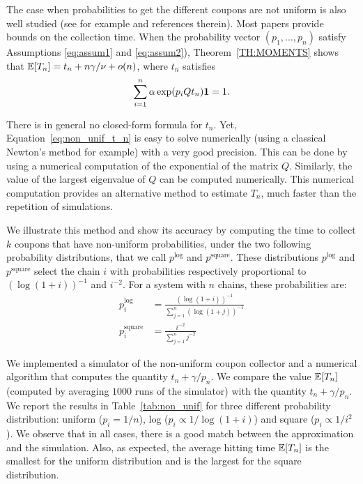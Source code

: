 \documentclass{aptpub}
\newcommand\expect[1]{\mathchoice{\bexpect{#1}}{\sexpect{#1}}{\sexpect{#1}}{\sexpect{#1}}}
\newcommand\bexpect[1]{\mathbb{E}\left[#1\right]}
\newcommand\sexpect[1]{\mathbb{E}[#1]}
\begin{document}
The case when probabilities to get the different coupons are not
uniform is also well studied (see for example \cite{Berenbrink} and
references therein).  Most papers provide bounds on the collection
time.  When the probability vector $(p_1, \dots , p_n)$ satisfy
Assumptions \eqref{eq:assum1} and \eqref{eq:assum2}),
Theorem~\ref{TH:MOMENTS} shows that
$\expect{T_n}= t_n + n\gamma/\nu + o(n)$, where $t_n$ satisfies
\begin{equation}
  \label{eq:non_unif_t_n}
  \sum_{i=1}^n \alpha \exp(p_iQt_n){\bf 1} = 1.
\end{equation}

There is in general no closed-form formula for $t_n$. Yet,
Equation~\eqref{eq:non_unif_t_n} is easy to solve numerically (using a
classical Newton's method for example) with a very good
precision. This can be done by using a numerical computation of the
exponential of the matrix $Q$.  Similarly, the value of the largest
eigenvalue of $Q$ can be computed numerically.  This numerical
computation provides an alternative method to estimate $T_n$, much
faster than the repetition of simulations.

We illustrate this method and show its accuracy by computing the time
to collect $k$ coupons that have non-uniform probabilities, under the
two following probability distributions, that we call $p^{\log}$ and
$p^{\text{square}}$. These distributions $p^{\log}$ and $p^{\text{square}}$ select the chain
$i$ with probabilities respectively proportional to
$(\log (1+i))^{-1}$ and $i^{-2}$. For a system with $n$ chains, these
probabilities are:
\begin{align*}
  p_i^{\log} &= \frac{(\log (1+i))^{-1}}{\sum_{j=1}^n (\log(1+j))^{-1}}\\
  p_i^{\text{square}} &= \frac{i^{-2}}{\sum_{j=1}^n j^{-2}}
\end{align*}

We implemented a simulator of the non-uniform coupon collector and a
numerical algorithm that computes the quantity $t_n+\gamma/p_n$. We
compare the value $\expect{T_n}$ (computed by averaging $1000$ runs of
the simulator) with the quantity $t_n+\gamma/p_n$. We report the
results in Table~\ref{tab:non_unif} for three different probability
distribution: uniform ($p_i=1/n$), log ($p_i\propto 1/\log(1+i)$) and
square ($p_i\propto 1/i^2$). We observe that in all cases, there is a
good match between the approximation and the simulation. Also, as
expected, the average hitting time $\expect{T_n}$ is the smallest for
the uniform distribution and is the largest for the square
distribution.
\end{document}
